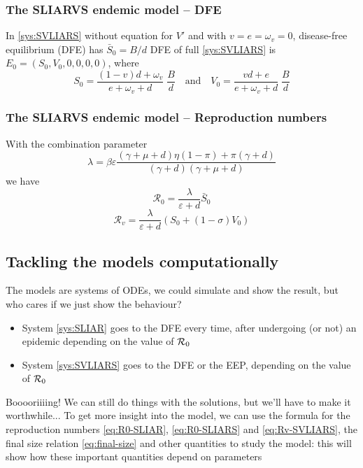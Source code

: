 \documentclass[aspectratio=169]{beamer}\usepackage[]{graphicx}\usepackage[]{xcolor}
\begin{document}
\begin{frame}\frametitle{The SLIARVS endemic model -- DFE}
In \eqref{sys:SVLIARS} without equation for $V'$ and with $v=e=\omega_v=0$, disease-free equilibrium (DFE) has $\bar S_0=B/d$
\vfill
DFE of full \eqref{sys:SVLIARS} is $E_0 = (S_0,V_0,0,0,0,0)$, where
\begin{equation}\label{eq:DFE-SVLIARS}
S_0 = \frac{(1-v)d+\omega_v}{e+\omega_v+d}\; \frac Bd 
\quad\textrm{and}\quad
V_0 = \frac{vd+e}{e+\omega_v+d}\;\frac Bd
\end{equation}
\end{frame}


\begin{frame}\frametitle{The SLIARVS endemic model -- Reproduction numbers}
With the combination parameter
\begin{equation}\label{eq:lambda}
\lambda = \beta\varepsilon
\frac{(\gamma+\mu+d)\eta(1-\pi) + \pi(\gamma + d)}
{(\gamma + d)(\gamma+\mu+d)}
\end{equation}
we have
\begin{equation}\label{eq:R0-SLIARS}
\mathcal{R}_0 = \frac{\lambda}{\varepsilon+d}\bar S_0
\end{equation}
\begin{equation}\label{eq:Rv-SVLIARS}
\mathcal{R}_v=\frac{\lambda}{\varepsilon+d}(S_0+(1-\sigma)V_0)
\end{equation}
\end{frame}


\subsection{Tackling the models computationally}

\begin{frame}
The models are systems of ODEs, we could simulate and show the result, but who cares if we just show the behaviour?
\begin{itemize}
\item System \eqref{sys:SLIAR} goes to the DFE every time, after undergoing (or not) an epidemic depending on the value of $\mathcal{R}_0$
\item System \eqref{sys:SVLIARS} goes to the DFE or the EEP, depending on the value of $\mathcal{R}_0$
\end{itemize}
\vfill
Booooriiiing!
\vfill
We can still do things with the solutions, but we'll have to make it worthwhile...
\vfill
To get more insight into the model, we can use the formula for the reproduction numbers \eqref{eq:R0-SLIAR}, \eqref{eq:R0-SLIARS} and \eqref{eq:Rv-SVLIARS}, the final size relation \eqref{eq:final-size} and other quantities to study the model: this will show how these important quantities depend on parameters
\end{frame}
\end{document}
